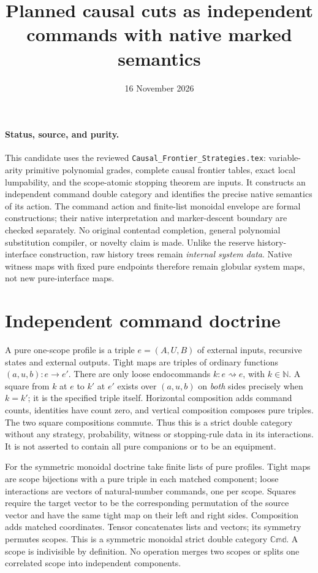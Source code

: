 \documentclass{article}
\title{Planned causal cuts as independent commands with native marked semantics}
\date{16 November 2026}
\begin{document}
\maketitle
\paragraph{Status, source, and purity.}
This candidate uses the reviewed \texttt{Causal\_Frontier\_Strategies.tex}:
variable-arity primitive polynomial grades, complete causal frontier tables,
exact local lumpability, and the scope-atomic stopping theorem are inputs.
It constructs an independent command double category and identifies the
precise native semantics of its action. The command action and finite-list
monoidal envelope are formal constructions; their native interpretation and
marker-descent boundary are checked separately. No original contentad
completion, general polynomial substitution compiler, or novelty claim is
made. Unlike the reserve history-interface construction, raw history trees
remain \emph{internal system data}. Native witness maps with fixed pure
endpoints therefore remain globular system maps, not new pure-interface maps.

\section{Independent command doctrine}
A pure one-scope profile is a triple $e=(A,U,B)$ of external inputs, recursive
states and external outputs. Tight maps are triples of ordinary functions
$(a,u,b):e\to e'$. There are only loose endocommands $k:e\rightsquigarrow e$,
with $k\in\mathbb N$. A square from $k$ at $e$ to $k'$ at $e'$ exists over
$(a,u,b)$ on \emph{both} sides precisely when $k=k'$; it is the specified
triple itself. Horizontal composition adds command counts, identities have
count zero, and vertical composition composes pure triples. The two square
compositions commute. Thus this is a strict double category without any
strategy, probability, witness or stopping-rule data in its interactions.
It is not asserted to contain all pure companions or to be an equipment.

For the symmetric monoidal doctrine take finite lists of pure profiles.
Tight maps are scope bijections with a pure triple in each matched component;
loose interactions are vectors of natural-number commands, one per scope.
Squares require the target vector to be the corresponding permutation of the
source vector and have the same tight map on their left and right sides.
Composition adds matched coordinates. Tensor concatenates lists and vectors;
its symmetry permutes scopes. This is a symmetric monoidal strict double
category $\mathbb{Cmd}$. A scope is indivisible by definition. No operation
merges two scopes or splits one correlated scope into independent components.
\end{document}
